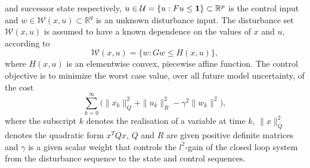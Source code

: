 \documentclass{ifacconf}
\begin{document}
and successor state respectively, $u\in\mathcal U=\{u:Fu\leq{\bf{1}}\}\subset\mathbb R^p$ is the control input
and $w\in\mathcal W(x,u)\subset\mathbb R^q$ is an unknown disturbance input. The disturbance set $\mathcal
W(x,u)$ is assumed to have a known dependence on the values of $x$ and $u$, according to
%
\begin{equation}\label{eq:PWA:def:disturbance}
	\mathcal W(x,u) = \{w: Gw \leq H(x,u)\},
\end{equation}
%
where $H(x,u)$ is an elementwise convex, piecewise affine function. The control objective is to minimize the
worst case value, over all future model uncertainty, of the cost
\begin{equation}\label{eq:quadratic:cost}
\sum_{k=0}^\infty \bigl( \|x_k\|_Q^2 + \|u_k\|_R^2 - \gamma^2 \|w_k\|^2 \bigr) ,
\end{equation}
where the subscript $k$ denotes the realisation of a variable at time $k$, $\|x\|_Q^2$ denotes the quadratic
form $x^TQx$, $Q$ and $R$ are given positive definite
matrices and $\gamma$ is a given scalar weight that controls the $l^2$-gain of the closed loop system from the
disturbance sequence to the state and control sequences.
\end{document}
